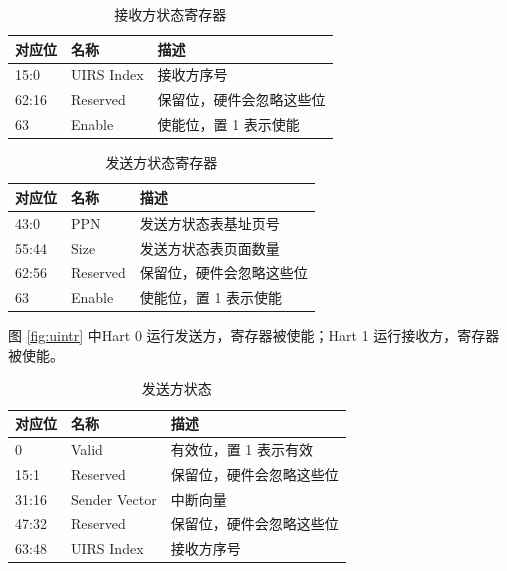 \begin{table}
    \centering
    \begin{threeparttable}[c]
        \label{tab:suirs}
        \begin{tabular}{|l|l|l|}
            \hline
            对应位 & 名称 & 描述 \\
            \hline
            15:0 & UIRS Index & 接收方序号 \\
            \hline
            62:16 & Reserved & 保留位，硬件会忽略这些位 \\
            \hline
            63 & Enable & 使能位，置 1 表示使能 \\
            \hline
        \end{tabular}
        \caption{接收方状态寄存器}
    \end{threeparttable}
\end{table}

\begin{table}
    \centering
    \begin{threeparttable}[c]
        \label{tab:suist}
        \begin{tabular}{|l|l|l|}
            \hline
            对应位 & 名称 & 描述 \\
            \hline
            43:0 & PPN & 发送方状态表基址页号 \\
            \hline
            55:44 & Size & 发送方状态表页面数量 \\
            \hline
            62:56 & Reserved & 保留位，硬件会忽略这些位 \\
            \hline
            63 & Enable & 使能位，置 1 表示使能 \\
            \hline
        \end{tabular}
        \caption{发送方状态寄存器}
    \end{threeparttable}
\end{table}

图 \ref{fig:uintr} 中Hart 0 运行发送方，\Rsuist 寄存器被使能；Hart 1 运行接收方，\Rsuirs 寄存器被使能。

\begin{table}
    \centering
    \begin{threeparttable}[c]
        \label{tab:uiss}
        \begin{tabular}{|l|l|l|}
            \hline
            对应位 & 名称 & 描述 \\
            \hline
            0 & Valid & 有效位，置 1 表示有效 \\
            \hline
            15:1 & Reserved & 保留位，硬件会忽略这些位 \\
            \hline
            31:16 & Sender Vector & 中断向量 \\
            \hline
            47:32 & Reserved & 保留位，硬件会忽略这些位 \\
            \hline
            63:48 & UIRS Index & 接收方序号 \\
            \hline
        \end{tabular}
        \caption{发送方状态}
    \end{threeparttable}
\end{table}

